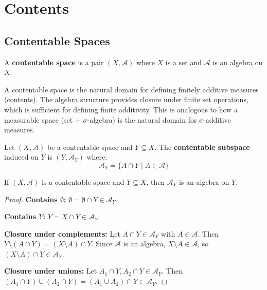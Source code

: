 \chapter{Contents}

\section{Contentable Spaces}

\begin{definition}
    A \textbf{contentable space} is a pair $(X, \mathcal{A})$ where $X$ is a set 
    and $\mathcal{A}$ is an algebra on $X$.
\end{definition}

\begin{intuition}
    A contentable space is the natural domain for defining finitely additive measures (contents). 
    The algebra structure provides closure under finite set operations, which is sufficient 
    for defining finite additivity. This is analogous to how a measurable space 
    (set + $\sigma$-algebra) is the natural domain for $\sigma$-additive measures.
\end{intuition}

\medskip
\begin{definition}
    Let $(X, \mathcal{A})$ be a contentable space and $Y \subseteq X$. 
    The \textbf{contentable subspace} induced on $Y$ is $(Y, \mathcal{A}_Y)$ where:
    \[
        \mathcal{A}_Y = \{ A \cap Y \mid A \in \mathcal{A} \}
    \]
\end{definition}

\begin{proposition}
    If $(X, \mathcal{A})$ is a contentable space and $Y \subseteq X$, then 
    $\mathcal{A}_Y$ is an algebra on $Y$.
\end{proposition}

\begin{proof}
    \textbf{Contains $\emptyset$:} $\emptyset = \emptyset \cap Y \in \mathcal{A}_Y$.

    \textbf{Contains $Y$:} $Y = X \cap Y \in \mathcal{A}_Y$.

    \textbf{Closure under complements:} Let $A \cap Y \in \mathcal{A}_Y$ with $A \in \mathcal{A}$. 
    Then $Y \setminus (A \cap Y) = (X \setminus A) \cap Y$. 
    Since $\mathcal{A}$ is an algebra, $X \setminus A \in \mathcal{A}$, so 
    $(X \setminus A) \cap Y \in \mathcal{A}_Y$.

    \textbf{Closure under unions:} Let $A_1 \cap Y, A_2 \cap Y \in \mathcal{A}_Y$. 
    Then $(A_1 \cap Y) \cup (A_2 \cap Y) = (A_1 \cup A_2) \cap Y \in \mathcal{A}_Y$.
\end{proof}

